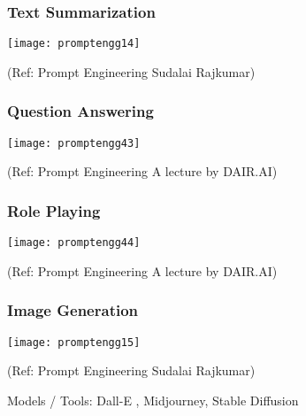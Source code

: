 \begin{frame}[fragile]\frametitle{Text Summarization}

\begin{center}
\texttt{[image: promptengg14]}

{\tiny (Ref: Prompt Engineering Sudalai Rajkumar)}

\end{center}		
		


\end{frame}


\begin{frame}[fragile]\frametitle{Question Answering}

\begin{center}
\texttt{[image: promptengg43]}

{\tiny (Ref: Prompt Engineering A lecture by DAIR.AI)}

\end{center}
\end{frame}


\begin{frame}[fragile]\frametitle{Role Playing}

\begin{center}
\texttt{[image: promptengg44]}

{\tiny (Ref: Prompt Engineering A lecture by DAIR.AI)}

\end{center}
\end{frame}


\begin{frame}[fragile]\frametitle{Image Generation}

\begin{center}
\texttt{[image: promptengg15]}

{\tiny (Ref: Prompt Engineering Sudalai Rajkumar)}

\end{center}		
		
		
Models / Tools: Dall-E , Midjourney, Stable Diffusion

\end{frame}

